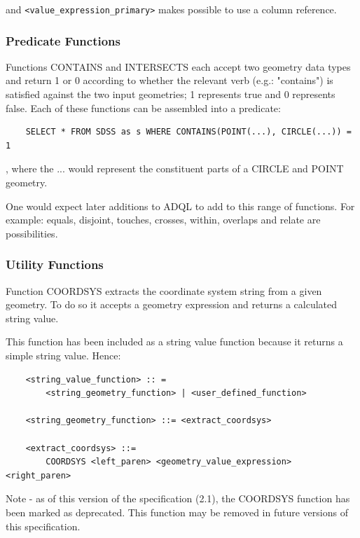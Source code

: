 \documentclass[11pt,a4paper]{ivoa}
\begin{document}
and \verb:<value_expression_primary>: makes possible to use a column reference.

\subsubsection{Predicate Functions}
\label{sec:geom.functions.predicate}

Functions CONTAINS and INTERSECTS each accept two geometry data types
and return 1 or 0 according to whether the relevant verb (e.g.: "contains") is
satisfied against the two input geometries; 1 represents true and 0 represents
false. Each of these functions can be assembled into a predicate:

\begin{verbatim}
    SELECT * FROM SDSS as s WHERE CONTAINS(POINT(...), CIRCLE(...)) = 1
\end{verbatim}

, where the ... would represent the constituent parts of a CIRCLE and POINT
geometry.

One would expect later additions to ADQL to add to this range of functions. For
example: equals, disjoint, touches, crosses, within, overlaps and relate
are possibilities.

\subsubsection{Utility Functions}
\label{sec:geom.functions.utility}

Function COORDSYS extracts the coordinate system string from a given
geometry. To do so it accepts a geometry expression and returns a calculated
string value.

This function has been included as a string value function because it
returns a simple string value. Hence:

\begin{verbatim}
    <string_value_function> :: =
        <string_geometry_function> | <user_defined_function>

    <string_geometry_function> ::= <extract_coordsys>

    <extract_coordsys> ::=
        COORDSYS <left_paren> <geometry_value_expression> <right_paren>
\end{verbatim}

Note - as of this version of the specification (2.1), the COORDSYS function has
been marked as deprecated. This function may be removed in future versions
of this specification.
\end{document}
